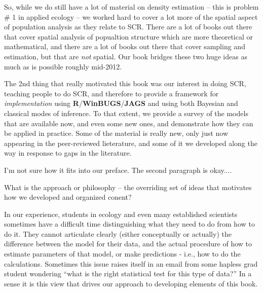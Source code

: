 So, while we do still have a lot of material on
density estimation -- this is problem \# 1 in applied ecology -- we
worked hard to cover a lot more of the spatial aspect of population
analysis as they relate to SCR. 
There are a
lot of books out there that cover spatial analysis of popualtion
structure which are more theoretical or mathematical, and there are a
lot of books out there that cover sampling and estimation, but that
are {\it not} spatial. Our book bridges these two huge ideas as much
as is possible roughly mid-2012.  

The 2nd thing that really
motivated this book was our interest in doing SCR, teaching people to
do SCR, and therefore to provide a framework for {\it implementation}
using \textbf{R}/\textbf{WinBUGS}/\textbf{JAGS} and using both Bayesian and classical modes of
inference.  To that extent, we provide a survey
of the models that are available now, and even some new ones, and
demonstrate how they can be applied in practice. Some of the material
is really new, only just now appearing in the peer-reviewed
lieterature, and some of it we developed along the way in response to
gaps in the literature.

I'm not sure how it fits into our preface.    The second paragraph is
okay....

What is the approach or philosophy -- the overriding set of ideas that
motivates how we developed and organized conent?

In our experience, students in ecology
and even many established scientists sometimes have a difficult time
distinguishing what they need to do from how to do it.  They
cannot articulate clearly (either conceptually or actually) the
difference between the model for their data, and the actual procedure
of how to estimate parameters of that model, or make predictions -
i.e., how to do the calculations. Sometimes this issue raises itself in
an email from some hapless grad student wondering ``what is the right
statistical test for this type of data?''  In a sense it is this view
that drives our approach to developing elements of this book.


